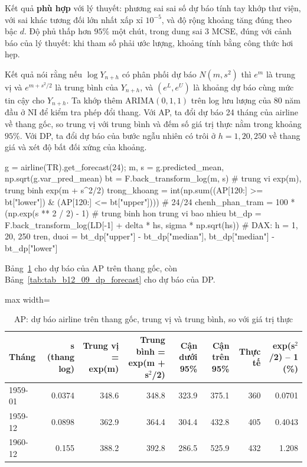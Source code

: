  Kết quả \textbf{phù hợp} với lý thuyết: phương sai sai số dự báo tính tay khớp thư viện, với sai khác tương đối lớn nhất xấp xỉ $10^{-5}$, và độ rộng khoảng tăng đúng theo bậc $d$. Độ phủ thấp hơn $95\%$ một chút, trong dung sai $3$ MCSE, đúng với cảnh báo của lý thuyết: khi tham số phải ước lượng, khoảng tính bằng công thức hơi hẹp.

 Kết quả  nói rằng nếu $\log Y_{n+h}$ có phân phối dự báo $N(m,s^2)$ thì $e^m$ là trung vị và $e^{m+s^2/2}$ là trung bình của $Y_{n+h}$, và $(e^L,e^U)$ là khoảng dự báo cùng mức tin cậy cho $Y_{n+h}$.
 Ta khớp thêm ARIMA$(0,1,1)$ trên log lưu lượng của 80 năm đầu ở NI để kiểm tra phép đổi thang. Với AP, ta đổi dự báo 24 tháng của airline về thang gốc, so trung vị với trung bình và đếm số giá trị thực nằm trong khoảng $95\%$. Với DP, ta đổi dự báo của bước ngẫu nhiên có trôi ở $h=1,20,250$ về thang giá và xét độ bất đối xứng của khoảng.
\begin{codeblock}
g = airline(TR).get_forecast(24); m, s = g.predicted_mean, np.sqrt(g.var_pred_mean)
bt = F.back_transform_log(m, s)               # trung vi exp(m), trung binh exp(m + s^2/2)
trong_khoang = int(np.sum((AP[120:] >= bt["lower"]) & (AP[120:] <= bt["upper"])))   # 24/24
chenh_phan_tram = 100 * (np.exp(s ** 2 / 2) - 1)     # trung binh hon trung vi bao nhieu %
bt_dp = F.back_transform_log(LD[-1] + delta * hs, sigma * np.sqrt(hs))   # DAX: h = 1, 20, 250
tren, duoi = bt_dp["upper"] - bt_dp["median"], bt_dp["median"] - bt_dp["lower"]
\end{codeblock}
 Bảng~\ref{tab:tab_b12_09_ap_backtransform} cho dự báo của AP trên thang gốc, còn Bảng~\ref{tab:tab_b12_09_dp_forecast} cho dự báo của DP.
\begin{table}[H]
\centering\footnotesize
\caption{AP: dự báo airline trên thang gốc, trung vị và trung bình, so với giá trị thực}\label{tab:tab_b12_09_ap_backtransform}
\begin{adjustbox}{max width=\linewidth}
\begin{tabular}{|l|r|r|r|r|r|r|r|}
\toprule
Tháng & s (thang log) & Trung vị = exp(m) & Trung bình = exp(m + s$^{2}$/2) & Cận dưới 95\% & Cận trên 95\% & Thực tế & exp(s$^{2}$/2) – 1 (\%) \\
\midrule
1959-01 & 0.0374 & 348.6 & 348.8 & 323.9 & 375.1 & 360 & 0.0701 \\
1959-12 & 0.0898 & 362.9 & 364.4 & 304.4 & 432.8 & 405 & 0.4043 \\
1960-12 & 0.155 & 388.2 & 392.8 & 286.5 & 525.9 & 432 & 1.208 \\
\bottomrule
\end{tabular}
\end{adjustbox}
\end{table}
